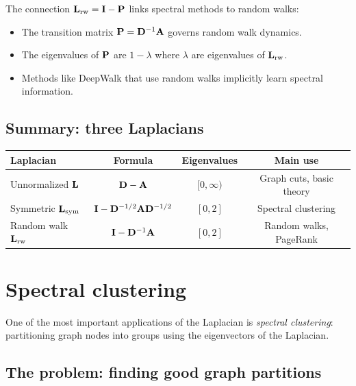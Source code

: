 \begin{notechapter}
\begin{keyidea}
The connection $\mathbf{L}_{\text{rw}} = \mathbf{I} - \mathbf{P}$ links spectral methods to random walks:
\begin{itemize}
    \item The transition matrix $\mathbf{P} = \mathbf{D}^{-1}\mathbf{A}$ governs random walk dynamics.
    \item The eigenvalues of $\mathbf{P}$ are $1 - \lambda$ where $\lambda$ are eigenvalues of $\mathbf{L}_{\text{rw}}$.
    \item Methods like DeepWalk that use random walks implicitly learn spectral information.
\end{itemize}
\end{keyidea}

\subsection{Summary: three Laplacians}

\begin{center}
\begin{tabular}{lccc}
\toprule
Laplacian & Formula & Eigenvalues & Main use \\
\midrule
Unnormalized $\mathbf{L}$ & $\mathbf{D} - \mathbf{A}$ & $[0, \infty)$ & Graph cuts, basic theory \\
Symmetric $\mathbf{L}_{\text{sym}}$ & $\mathbf{I} - \mathbf{D}^{-1/2}\mathbf{A}\mathbf{D}^{-1/2}$ & $[0, 2]$ & Spectral clustering \\
Random walk $\mathbf{L}_{\text{rw}}$ & $\mathbf{I} - \mathbf{D}^{-1}\mathbf{A}$ & $[0, 2]$ & Random walks, PageRank \\
\bottomrule
\end{tabular}
\end{center}

\section{Spectral clustering}

One of the most important applications of the Laplacian is \emph{spectral clustering}: partitioning graph nodes into groups using the eigenvectors of the Laplacian.

\subsection{The problem: finding good graph partitions}


\end{notechapter}
